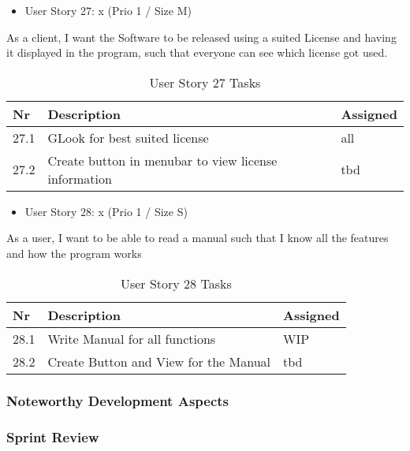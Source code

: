 \begin{itemize}
	\item User Story 27: x (Prio 1 / Size M)
	\end{itemize}
As a client,
I want the Software to be released using a suited License and having it displayed in the program,
such that everyone can see which license got used.	
\begin{table}[h]
  \caption{User Story 27 Tasks}
  \label{Story 23 Tasks}
  \centering
  \begin{tabular}{p{1cm}|p{5cm}|p{3cm}|}
  	Nr & Description & Assigned \\ 
  	\hline
  	27.1 & GLook for best suited license & all \\ 
  	\hline
  	27.2 & Create button in menubar to view license information & tbd \\ 
  	\hline
  \end{tabular}
\end{table}

\begin{itemize}
	\item User Story 28: x (Prio 1 / Size S)
	\end{itemize}
As a user,
I want to be able to read a manual
such that I know all the features and how the program works
\begin{table}[h]
  \caption{User Story 28 Tasks}
  \label{Story 28 Tasks}
  \centering
  \begin{tabular}{p{1cm}|p{5cm}|p{3cm}|}
  	Nr & Description & Assigned \\ 
  	\hline
  	28.1 & Write Manual for all functions & WIP \\ 
  	\hline
  	28.2 & Create Button and View for the Manual & tbd \\ 
  	\hline
  \end{tabular}
\end{table}

\subsubsection*{Noteworthy Development Aspects}

\subsubsection*{Sprint Review}


